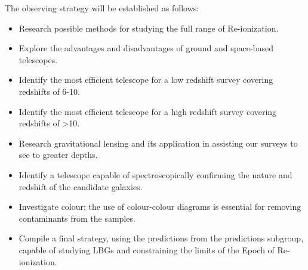 	The observing strategy will be established as follows:
	\begin{itemize}
		\item Research possible methods for studying the full range of Re-ionization.
		\item Explore the advantages and disadvantages of ground and space-based telescopes.
		\item Identify the most efficient telescope for a low redshift survey covering redshifts of 6-10.
		\item Identify the most efficient telescope for a high redshift survey covering redshifts of >10.
		\item Research gravitational lensing and its application in assisting our surveys to see to greater depths.
		\item Identify a telescope capable of spectroscopically confirming the nature and redshift of the candidate galaxies.
		\item Investigate colour; the use of colour-colour diagrams is essential for removing contaminants from the samples.
		\item Compile a final strategy, using the predictions from the predictions subgroup, capable of studying LBGs and constraining the limits of the Epoch of Re-ionization.
	\end{itemize}

